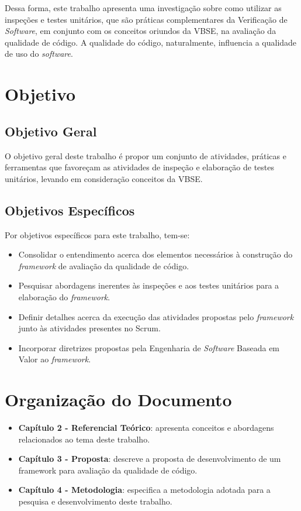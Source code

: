 Dessa forma, este trabalho apresenta uma investigação sobre como utilizar as inspeções e testes unitários, que são práticas complementares da Verificação de \textit{Software}, em conjunto com os conceitos oriundos da VBSE, na avaliação da qualidade de código. A qualidade do código, naturalmente, influencia a qualidade de uso do \textit{software}.

\section{Objetivo}

\subsection{Objetivo Geral}

O objetivo geral deste trabalho é propor um conjunto de atividades, práticas e ferramentas que favoreçam as atividades de inspeção e elaboração de testes unitários, levando em consideração conceitos da VBSE.

\subsection{Objetivos Específicos}

Por objetivos específicos para este trabalho, tem-se:

\begin{itemize}
	\item Consolidar o entendimento acerca dos elementos necessários à construção do \textit{framework} de avaliação da qualidade de código.
	\item Pesquisar abordagens inerentes às inspeções e aos testes unitários para a elaboração do \textit{framework}.
	\item Definir detalhes acerca da execução das atividades propostas pelo \textit{framework} junto às atividades presentes no Scrum.
	\item Incorporar diretrizes propostas pela Engenharia de \textit{Software} Baseada em Valor ao \textit{framework}.
\end{itemize}

\section{Organização do Documento}

\begin{itemize}
	\item \textbf{Capítulo 2 - Referencial Teórico}: apresenta conceitos e abordagens relacionados ao tema deste trabalho.

	\item \textbf{Capítulo 3 - Proposta}: descreve a proposta de desenvolvimento de um framework para avaliação da qualidade de código.

	\item \textbf{Capítulo 4 - Metodologia}: especifica a metodologia adotada para a pesquisa e desenvolvimento deste trabalho.
\end{itemize}